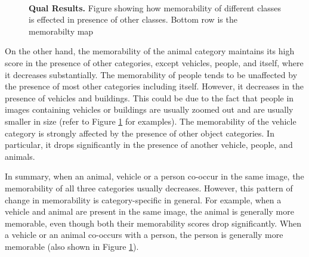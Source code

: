\begin{figure}[!htb]
\centering
{}
\\
\vspace{-5mm}\caption{\footnotesize\textbf{Qual Results.} Figure showing how memorability of different classes is effected in presence of other classes. Bottom row is the memorabilty map}\label{fig:qualInterClass}
\end{figure}

On the other hand, the memorability of the animal category maintains its high score in the presence of other categories, except vehicles, people, and itself, where it decreases substantially. The memorability of people tends to be unaffected by the presence of most other categories including itself. However, it decreases in the presence of vehicles and buildings. This could be due to the fact that people in images containing vehicles or buildings are usually zoomed out and are usually smaller in size (refer to Figure \ref{fig:qualInterClass} for  examples). The memorability of the vehicle category is strongly affected by the presence of other object categories. In particular, it drops significantly in the presence of another vehicle, people, and animals. 

In summary, when an animal, vehicle or a person co-occur in the same image, the memorability of all three categories usually decreases. However, this pattern of change in memorability is category-specific in general. For example, when a vehicle and animal are present in the same image, the animal is generally more memorable, even though both their memorability scores drop significantly. When a vehicle or an animal co-occurs with a person, the person is generally more memorable (also shown in Figure \ref{fig:qualInterClass}).





